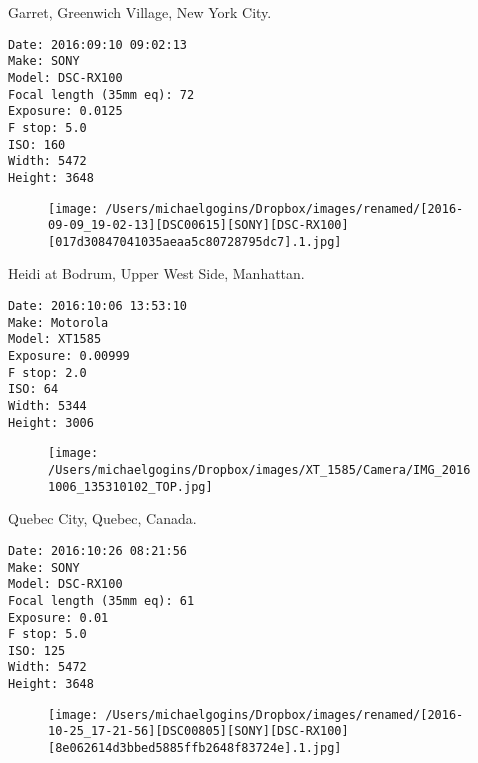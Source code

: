\documentclass[11pt,letter,DIV=14,paper=landscape]{scrbook}
\begin{document}
\clearpage
\noindent Garret, Greenwich Village, New York City.
\noindent
\begin{lstlisting}
Date: 2016:09:10 09:02:13
Make: SONY
Model: DSC-RX100
Focal length (35mm eq): 72
Exposure: 0.0125
F stop: 5.0
ISO: 160
Width: 5472
Height: 3648
\end{lstlisting}
\clearpage

\begin{figure}
\texttt{[image: /Users/michaelgogins/Dropbox/images/renamed/[2016-09-09\_19-02-13][DSC00615][SONY][DSC-RX100][017d30847041035aeaa5c80728795dc7].1.jpg]}
\end{figure}
    
\clearpage
\noindent Heidi at Bodrum, Upper West Side, Manhattan.
\noindent
\begin{lstlisting}
Date: 2016:10:06 13:53:10
Make: Motorola
Model: XT1585
Exposure: 0.00999
F stop: 2.0
ISO: 64
Width: 5344
Height: 3006
\end{lstlisting}
\clearpage

\begin{figure}
\texttt{[image: /Users/michaelgogins/Dropbox/images/XT\_1585/Camera/IMG\_20161006\_135310102\_TOP.jpg]}
\end{figure}
    
\clearpage
\noindent Quebec City, Quebec, Canada.
\noindent
\begin{lstlisting}
Date: 2016:10:26 08:21:56
Make: SONY
Model: DSC-RX100
Focal length (35mm eq): 61
Exposure: 0.01
F stop: 5.0
ISO: 125
Width: 5472
Height: 3648
\end{lstlisting}
\clearpage

\begin{figure}
\texttt{[image: /Users/michaelgogins/Dropbox/images/renamed/[2016-10-25\_17-21-56][DSC00805][SONY][DSC-RX100][8e062614d3bbed5885ffb2648f83724e].1.jpg]}
\end{figure}
    
\end{document}
